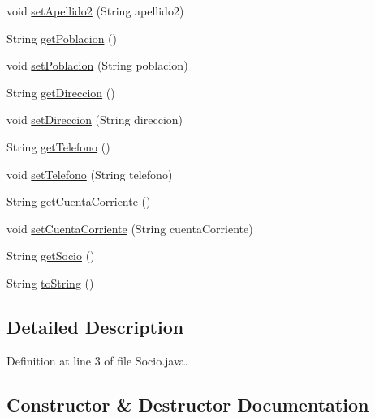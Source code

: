 \begin{DoxyCompactItemize}
\item 
void \mbox{\hyperlink{classsociedad2_1_1_socio_a90b515239e7d30207498da73e1149177}{set\+Apellido2}} (String apellido2)
\item 
String \mbox{\hyperlink{classsociedad2_1_1_socio_ac3e736fa7d2c1e66bae1cfac3645b15d}{get\+Poblacion}} ()
\item 
void \mbox{\hyperlink{classsociedad2_1_1_socio_a75812ed455981e7536229b14c2b54cab}{set\+Poblacion}} (String poblacion)
\item 
String \mbox{\hyperlink{classsociedad2_1_1_socio_a29938889a9206620df5f22fce680d28f}{get\+Direccion}} ()
\item 
void \mbox{\hyperlink{classsociedad2_1_1_socio_a89eac57c5634e388f0bcf81301f230b7}{set\+Direccion}} (String direccion)
\item 
String \mbox{\hyperlink{classsociedad2_1_1_socio_afd9e158c9ea49006ccc815e2c3c43fc0}{get\+Telefono}} ()
\item 
void \mbox{\hyperlink{classsociedad2_1_1_socio_a67d6043669e2f98671fcd2e8c8ff882f}{set\+Telefono}} (String telefono)
\item 
String \mbox{\hyperlink{classsociedad2_1_1_socio_a29002325c998cb7888762c74d2bdcfea}{get\+Cuenta\+Corriente}} ()
\item 
void \mbox{\hyperlink{classsociedad2_1_1_socio_a64c11ba08624bb242e4580f9c29c4c63}{set\+Cuenta\+Corriente}} (String cuenta\+Corriente)
\item 
String \mbox{\hyperlink{classsociedad2_1_1_socio_a1671fd7961025e6b3ea7e49506bbeb9e}{get\+Socio}} ()
\item 
String \mbox{\hyperlink{classsociedad2_1_1_socio_a12fad8af597150c781fe7e480e61d191}{to\+String}} ()
\end{DoxyCompactItemize}


\subsection{Detailed Description}


Definition at line 3 of file Socio.\+java.



\subsection{Constructor \& Destructor Documentation}
\mbox{\label{classsociedad2_1_1_socio_a115644bad315b519368f61e5a4b761cd}} 
